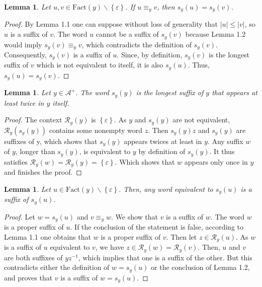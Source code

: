 \documentclass[11pt]{report}
\newtheorem{lemma}[theorem]{Lemma}
\begin{document}
\begin{lemma}
  Let \(u, v \in \text{Fact}(y)\backslash\left\{\varepsilon\right\}\). If \(u \equiv_y v\), then \(s_y(u) = s_y(v)\).
\end{lemma}
\begin{proof}
  By Lemma 1.1 one can suppose without loss of generality that $|u|
  \le |v|$, so $u$ is
  a suffix of $v$. The word $u$ cannot be a suffix of $s_y(v)$ because
  Lemma 1.2 would imply $s_y(v) \equiv_y v$, which contradicts the
  definition of $s_y(v)$. Consequently, $s_y(v)$ is a suffix of
  $u$. Since, by definition, $s_y(v)$ is the longest suffix of $v$
  which is not equivalent to itself, it is also $s_y(u)$. Thus, $s_y(u)=s_y(v)$.
\end{proof}
\begin{lemma}
  Let $y \in \mathcal{A}^+$. The word $s_y(y)$ is the longest suffix
  of $y$ that appears at least twice in $y$ itself.
\end{lemma}
\begin{proof}
  The context $\mathcal{R}_y(y)$ is $\left\{\varepsilon\right\}$. As
  $y$ and $s_y(y)$ are not equivalent, $\mathcal{R}_y(s_y(y))$
  contains some nonempty word $z$. Then $s_y(y)z$ and $s_y(y)$ are
  suffixes of y, which shows that $s_y(y)$ appears twices at least in
  $y$. Any suffix $w$ of $y$, longer than $s_y(y)$, is equivalent to
  $y$ by definition of $s_y(y)$. It thus satisfies $\mathcal{R}_y(w) =
  \mathcal{R}_y(y) = \left\{\varepsilon\right\}$. Which shows that $w$
  appears only once in $y$ and finishes the proof.
\end{proof}
\begin{lemma}
  Let $u \in
  \text{Fact}(y)\backslash\left\{\varepsilon\right\}$. Then, any word
  equivalent to $s_y(u)$ is a suffix of $s_y(u)$.
\end{lemma}
\begin{proof}
  Let $w = s_y(u)$ and $v \equiv_y w$. We show that $v$ is a suffix of
  $w$. The word $w$ is a proper suffix of $u$. If the conclusion of
  the statement is false, according to Lemma 1.1 one obtains that $w$
  is a proper suffix of $v$. Then let $z \in \mathcal{R}_y(u)$. As $w$
  is a suffix of $u$ equivalent to $v$, we have $z \in
  \mathcal{R}_y(w) = \mathcal{R}_y(v)$. Then, $u$ and $v$ are both
  suffixes of $yz^{-1}$, which implies that one is a suffix of the
  other. But this contradicts either the definition of $w = s_y(u)$ or
  the conclusion of Lemma 1.2, and proves that $v$ is a suffix of $w =
  s_y(u)$.
\end{proof}
\end{document}
